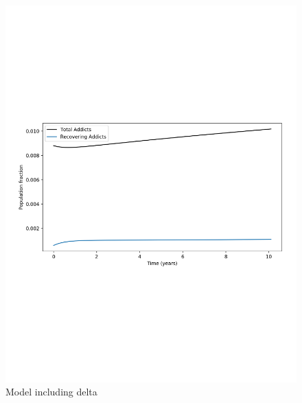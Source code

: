 \documentclass[12pt]{article}
\begin{document}
\vspace{-1.4cm}


\begin{figure}[!htb]
\hspace{-.85cm}
\begin{minipage}{.6\textwidth}
\centering
\includegraphics[width=.94\linewidth, height=0.28\textheight]{plot_with_delta_total}
\caption{Model including delta}
\end{minipage}
\hspace{-1.2cm}
\begin{minipage}{.6\textwidth}
\vspace{.8cm}
\centering

\end{minipage}
\end{figure}
\end{document}
